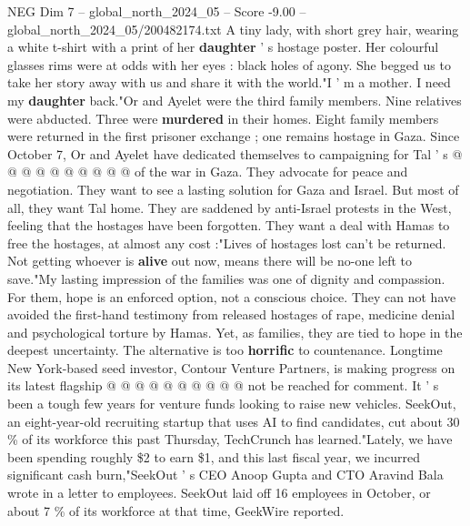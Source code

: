 \begin{textsample}{NEG Dim 7 – global\_north\_2024\_05 – Score -9.00 – global\_north\_2024\_05/200482174.txt}
A tiny lady, with short grey hair, wearing a white t-shirt with a print of her \textbf{daughter} ' s hostage poster.
Her colourful glasses rims were at odds with her eyes : black holes of agony.
She begged us to take her story away with us and share it with the world."I ' m a mother.
I need my \textbf{daughter} back."Or and Ayelet were the third family members.
Nine relatives were abducted.
Three were \textbf{murdered} in their homes.
Eight family members were returned in the first prisoner exchange ; one remains hostage in Gaza.
Since October 7, Or and Ayelet have dedicated themselves to campaigning for Tal ' s @ @ @ @ @ @ @ @ @ @ of the war in Gaza.
They advocate for peace and negotiation.
They want to see a lasting solution for Gaza and Israel.
But most of all, they want Tal home.
They are saddened by anti-Israel protests in the West, feeling that the hostages have been forgotten.
They want a deal with Hamas to free the hostages, at almost any cost :"Lives of hostages lost can't be returned.
Not getting whoever is \textbf{alive} out now, means there will be no-one left to save."My lasting impression of the families was one of dignity and compassion.
For them, hope is an enforced option, not a conscious choice.
They can not have avoided the first-hand testimony from released hostages of rape, medicine denial and psychological torture by Hamas.
Yet, as families, they are tied to hope in the deepest uncertainty.
The alternative is too \textbf{horrific} to countenance.
Longtime New York-based seed investor, Contour Venture Partners, is making progress on its latest flagship @ @ @ @ @ @ @ @ @ @ not be reached for comment.
It ' s been a tough few years for venture funds looking to raise new vehicles.
SeekOut, an eight-year-old recruiting startup that uses AI to find candidates, cut about 30 \% of its workforce this past Thursday, TechCrunch has learned."Lately, we have been spending roughly \$2 to earn \$1, and this last fiscal year, we incurred significant cash burn,"SeekOut ' s CEO Anoop Gupta and CTO Aravind Bala wrote in a letter to employees.
SeekOut laid off 16 employees in October, or about 7 \% of its workforce at that time, GeekWire reported.

\end{textsample}
